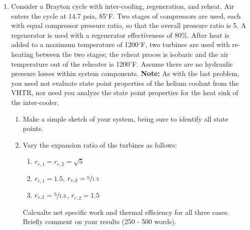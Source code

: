 \begin{fullwidth}
\begin{enumerate}
\item Consider a Brayton cycle with inter-cooling, regeneration, and reheat.  Air enters the cycle at 14.7 psia, 85$^{\circ}$F.  Two stages of compressors are used, each with equal compressor pressure ratio, so that the overall pressure ratio is 5.  A regenerator is used with a regenerator effectiveness of 80\%.  After heat is added to a maximum temperature of 1200$^{\circ}$F, two turbines are used with re-heating between the two stages; the reheat procss is isobaric and the air temperature out of the reheater is 1200$^{\circ}$F.  Assume there are no hydraulic pressure losses within system components.  \textbf{Note:} As with the last problem, you need not evaluate state point properties of the helium coolant from the VHTR, nor need you analyze the state point properties for the heat sink of the inter-cooler.
\begin{enumerate}
\item Make a simple sketch of your system, being sure to identify all state points.
\item Vary the expansion ratio of the turbines as follows:
\begin{enumerate}
\item $r_{e,1} = r_{e,2} = \sqrt{5}$
\item $r_{e,1} = 1.5$, $r_{e,2} = \sfrac{5}{1.5}$
\item $r_{e,1} = \sfrac{5}{1.5}$, $r_{e,2} = 1.5$
\end{enumerate}
Calcualte net specific work and thermal efficiency for all three cases.  Briefly comment on your results (250 - 500 words).
\end{enumerate}

\end{enumerate}


\end{fullwidth}
